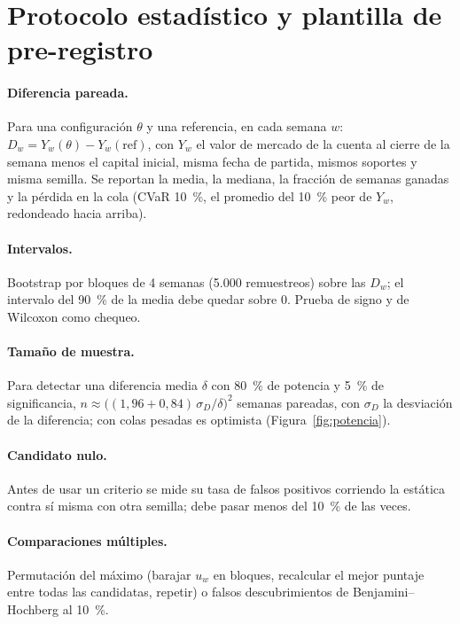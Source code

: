 \documentclass[11pt,a4paper]{article}
\begin{document}
\section{Protocolo estadístico y plantilla de pre-registro}

\paragraph{Diferencia pareada.} Para una configuración $\theta$ y una referencia, en cada semana $w$:
$D_w=Y_w(\theta)-Y_w(\mathrm{ref})$, con $Y_w$ el valor de mercado de la cuenta al cierre de la semana menos el capital inicial,
misma fecha de partida, mismos soportes y misma semilla. Se reportan la media, la mediana, la fracción de semanas ganadas y la
pérdida en la cola (CVaR 10~\%, el promedio del 10~\% peor de $Y_w$, redondeado hacia arriba).

\paragraph{Intervalos.} Bootstrap por bloques de 4 semanas (5.000 remuestreos) sobre las $D_w$; el intervalo del 90~\% de la media debe
quedar sobre 0. Prueba de signo y de Wilcoxon como chequeo.

\paragraph{Tamaño de muestra.} Para detectar una diferencia media $\delta$ con 80~\% de potencia y 5~\% de significancia,
$n\approx\bigl((1{,}96+0{,}84)\,\sigma_D/\delta\bigr)^2$ semanas pareadas, con $\sigma_D$ la desviación de la diferencia; con colas
pesadas es optimista (Figura~\ref{fig:potencia}).

\paragraph{Candidato nulo.} Antes de usar un criterio se mide su tasa de falsos positivos corriendo la estática contra sí misma con otra
semilla; debe pasar menos del 10~\% de las veces.

\paragraph{Comparaciones múltiples.} Permutación del máximo (barajar $u_w$ en bloques, recalcular el mejor puntaje entre todas las
candidatas, repetir) o falsos descubrimientos de Benjamini--Hochberg al 10~\%.
\end{document}
